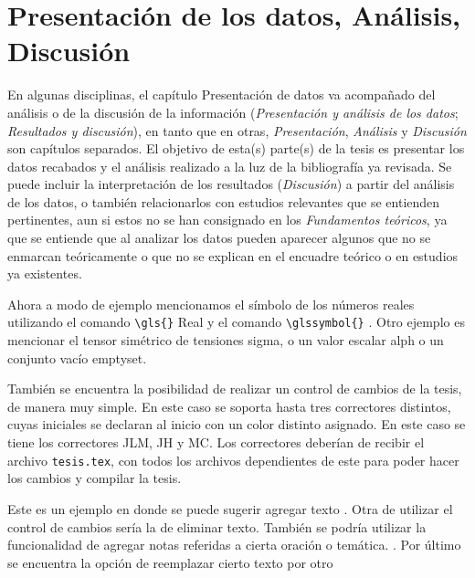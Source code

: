 \chapter{Presentación de los datos, Análisis, Discusión}

En algunas disciplinas, el capítulo Presentación de datos va acompañado del análisis o de la discusión de la información (\textit{Presentación y análisis de los datos}; \textit{Resultados y discusión}), en tanto que en otras, \textit{Presentación}, \textit{Análisis} y \textit{Discusión} son capítulos separados.
El objetivo de esta(s) parte(s) de la tesis es presentar los datos recabados y el análisis realizado a la luz de la bibliografía ya revisada. Se puede incluir la interpretación de los resultados (\textit{Discusión}) a partir del análisis de los datos, o también relacionarlos con estudios relevantes que se entienden pertinentes, aun si estos no se han consignado en los \textit{Fundamentos teóricos}, ya que se entiende que al analizar los datos pueden aparecer algunos que no se enmarcan teóricamente o que no se explican en el encuadre teórico o en estudios ya existentes.

Ahora a modo de ejemplo mencionamos el símbolo de los números reales utilizando el comando \verb|\gls{}| \gls{Real} y el comando \verb|\glssymbol{}| . Otro ejemplo es mencionar el tensor simétrico de tensiones \gls{sigma}, o un valor escalar  \gls{alph} o un conjunto vacío \gls{emptyset}.

También se encuentra la posibilidad de realizar un control de cambios de la tesis, de manera muy simple. En este caso se soporta hasta tres correctores distintos, cuyas iniciales se declaran al inicio con un color distinto asignado. En este caso se tiene los correctores \textcolor{redtex}{JLM}, \textcolor{bluetex}{JH} y \textcolor{greentex}{MC}. Los correctores deberían de recibir el archivo \verb|tesis.tex|, con todos los archivos dependientes de este para poder hacer los cambios y compilar la tesis. 

Este es un ejemplo en donde se puede sugerir agregar texto . Otra  de utilizar el control de cambios sería la de  eliminar texto. También se podría utilizar la funcionalidad de agregar notas referidas a cierta oración o temática. . Por último se encuentra la opción de reemplazar cierto texto por otro 

